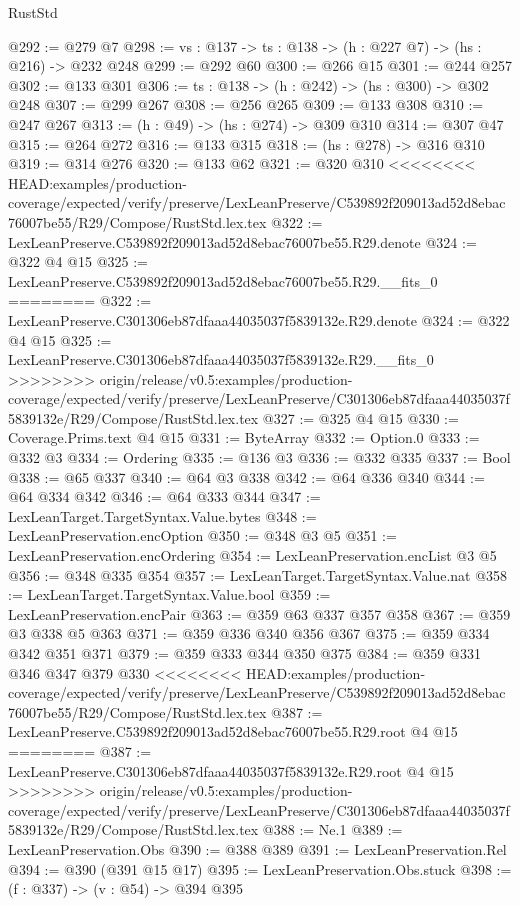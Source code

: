 \begin{lexlean}{RustStd}
\begin{coremodule}
{\begin{coremodule}
@292 := @279 @7
@298 := {vs : @137} -> {ts : @138} -> (h : @227 @7) -> (hs : @216) -> @232 @248
@299 := @292 @60
@300 := @266 @15
@301 := @244 @257
@302 := @133 @301
@306 := {ts : @138} -> (h : @242) -> (hs : @300) -> @302 @248
@307 := @299 @267
@308 := @256 @265
@309 := @133 @308
@310 := @247 @267
@313 := (h : @49) -> (hs : @274) -> @309 @310
@314 := @307 @47
@315 := @264 @272
@316 := @133 @315
@318 := (hs : @278) -> @316 @310
@319 := @314 @276
@320 := @133 @62
@321 := @320 @310
<<<<<<<< HEAD:examples/production-coverage/expected/verify/preserve/LexLeanPreserve/C539892f209013ad52d8ebac76007be55/R29/Compose/RustStd.lex.tex
@322 := LexLeanPreserve.C539892f209013ad52d8ebac76007be55.R29.denote
@324 := @322 @4 @15
@325 := LexLeanPreserve.C539892f209013ad52d8ebac76007be55.R29.__fits_0
========
@322 := LexLeanPreserve.C301306eb87dfaaa44035037f5839132e.R29.denote
@324 := @322 @4 @15
@325 := LexLeanPreserve.C301306eb87dfaaa44035037f5839132e.R29.__fits_0
>>>>>>>> origin/release/v0.5:examples/production-coverage/expected/verify/preserve/LexLeanPreserve/C301306eb87dfaaa44035037f5839132e/R29/Compose/RustStd.lex.tex
@327 := @325 @4 @15
@330 := Coverage.Prims.text @4 @15
@331 := ByteArray
@332 := Option.{0}
@333 := @332 @3
@334 := Ordering
@335 := @136 @3
@336 := @332 @335
@337 := Bool
@338 := @65 @337
@340 := @64 @3 @338
@342 := @64 @336 @340
@344 := @64 @334 @342
@346 := @64 @333 @344
@347 := LexLeanTarget.TargetSyntax.Value.bytes
@348 := LexLeanPreservation.encOption
@350 := @348 @3 @5
@351 := LexLeanPreservation.encOrdering
@354 := LexLeanPreservation.encList @3 @5
@356 := @348 @335 @354
@357 := LexLeanTarget.TargetSyntax.Value.nat
@358 := LexLeanTarget.TargetSyntax.Value.bool
@359 := LexLeanPreservation.encPair
@363 := @359 @63 @337 @357 @358
@367 := @359 @3 @338 @5 @363
@371 := @359 @336 @340 @356 @367
@375 := @359 @334 @342 @351 @371
@379 := @359 @333 @344 @350 @375
@384 := @359 @331 @346 @347 @379 @330
<<<<<<<< HEAD:examples/production-coverage/expected/verify/preserve/LexLeanPreserve/C539892f209013ad52d8ebac76007be55/R29/Compose/RustStd.lex.tex
@387 := LexLeanPreserve.C539892f209013ad52d8ebac76007be55.R29.root @4 @15
========
@387 := LexLeanPreserve.C301306eb87dfaaa44035037f5839132e.R29.root @4 @15
>>>>>>>> origin/release/v0.5:examples/production-coverage/expected/verify/preserve/LexLeanPreserve/C301306eb87dfaaa44035037f5839132e/R29/Compose/RustStd.lex.tex
@388 := Ne.{1}
@389 := LexLeanPreservation.Obs
@390 := @388 @389
@391 := LexLeanPreservation.Rel
@394 := @390 (@391 @15 @17)
@395 := LexLeanPreservation.Obs.stuck
@398 := (f : @337) -> (v : @54) -> @394 @395

\end{coremodule}}
\end{coremodule}
\end{lexlean}
